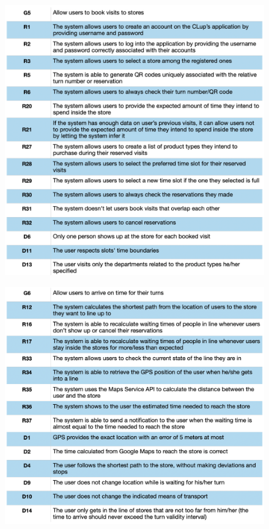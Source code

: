 \documentclass{article}
\begin{document}
\begin{figure}[H]
  \includegraphics[width=\linewidth]{Mapping5.png}
  
\end{figure}

\begin{figure}[H]
  \includegraphics[width=\linewidth]{Mapping6.png}
  
\end{figure}
\end{document}
